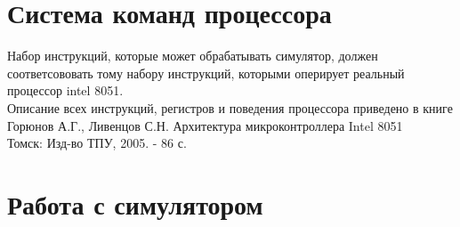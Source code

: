 \section{Система команд процессора}
Набор инструкций, которые может обрабатывать симулятор, должен соответсововать тому набору инструкций, которыми оперирует реальный процессор intel 8051.\\
Описание всех инструкций, регистров и поведения процессора приведено в книге \\[5mm]
Горюнов А.Г., Ливенцов С.Н. Архитектура микроконтроллера Intel 8051 \\
Томск: Изд-во ТПУ, 2005. - 86 с. \\

\section{Работа с симулятором}
